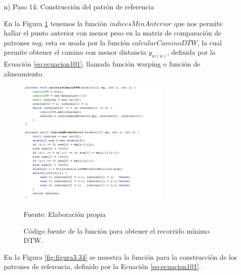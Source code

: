 \begin{enumerate}
\item[n)]Paso 14: Construcción del patrón de referencia
\par
En la Figura \ref{fig:figura3.33} tenemos la función $indicesMinAnterior$ que nos permite hallar el punto anterior con menor peso en la matriz de comparación de patrones $mg$, esta es usada por la función $calcularCaminoDTW$, la cual permite obtener el camino con menor distancia $y_{w(n)}$, definida por la Ecuación \eqref{eq:ecuacion101}, llamada función warping o función de alineamiento.
\begin{figure}[H]
\captionsetup{justification=centering}
\begin{center}
\includegraphics[width=0.7\textwidth]{Imagenes/Cap3/image033}
\end{center}
\begin{center}
\vskip -0.5cm
\caption{\small{Código fuente de la función para obtener el recorrido mínimo DTW.}}
\label{fig:figura3.33}
{\small{Fuente: Elaboración propia}}
\end{center}
\end{figure}
\vskip -0.5cm
En la Figura \ref{fig:figura3.34} se muestra la función para la construcción de los patrones de referencia, definido por la Ecuación \eqref{eq:ecuacion101}.
\begin{figure}[H]
\captionsetup{justification=centering}
\begin{center}

\end{center}
\end{figure}
\end{enumerate}
